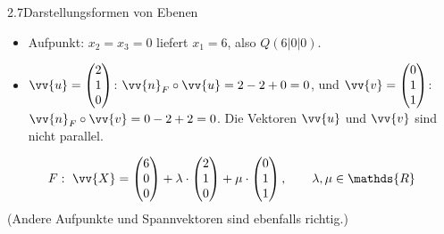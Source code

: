 \begin{loesung}{2.7}{Darstellungsformen von Ebenen}
\begin{enumerate}[label=\alph*)]
  \begin{itemize}
    \item Aufpunkt: $x_2=x_3=0$ liefert $x_1=6$, also $Q(6|0|0)$.
    \item $\vv{u} = \begin{pmatrix} 2\\ 1\\ 0\end{pmatrix}$: $\vv{n}_F\circ\vv{u} = 2-2+0 = 0$, und $\vv{v} = \begin{pmatrix} 0\\ 1\\ 1\end{pmatrix}$: $\vv{n}_F\circ\vv{v} = 0-2+2 = 0$. Die Vektoren $\vv{u}$ und $\vv{v}$ sind nicht parallel.
  \end{itemize}
  \[F:\ \vv{X} = \begin{pmatrix} 6\\ 0\\ 0\end{pmatrix}+\lambda\cdot\begin{pmatrix} 2\\ 1\\ 0\end{pmatrix}+\mu\cdot\begin{pmatrix} 0\\ 1\\ 1\end{pmatrix},\qquad\lambda,\mu\in\mathds{R}\]
  (Andere Aufpunkte und Spannvektoren sind ebenfalls richtig.)
\end{enumerate}
\end{loesung}

